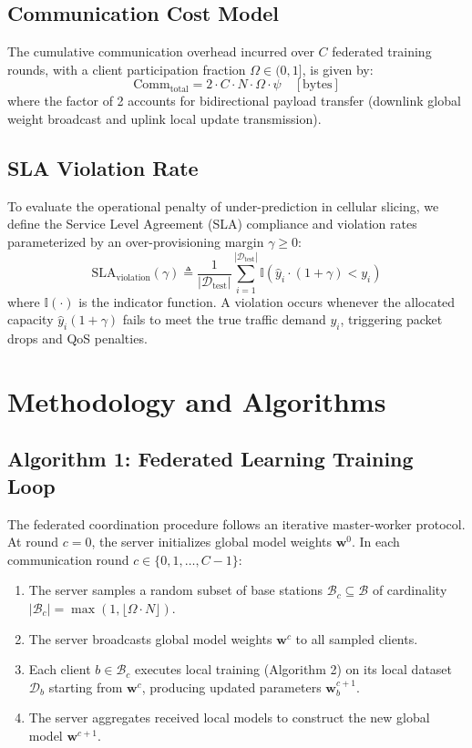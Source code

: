 \documentclass[10pt,journal,compsoc,twocolumn]{article}
\begin{document}
\subsection{Communication Cost Model}
The cumulative communication overhead incurred over $C$ federated training rounds, with a client participation fraction $\Omega \in (0, 1]$, is given by:
\begin{equation}
    \text{Comm}_{\text{total}} = 2 \cdot C \cdot N \cdot \Omega \cdot \psi \quad [\text{bytes}]
    \label{eq:comm_cost}
\end{equation}
where the factor of 2 accounts for bidirectional payload transfer (downlink global weight broadcast and uplink local update transmission).

\subsection{SLA Violation Rate}
To evaluate the operational penalty of under-prediction in cellular slicing, we define the Service Level Agreement (SLA) compliance and violation rates parameterized by an over-provisioning margin $\gamma \ge 0$:
\begin{equation}
    \text{SLA}_{\text{violation}}(\gamma) \triangleq \frac{1}{|\mathcal{D}_{\text{test}}|} \sum_{i=1}^{|\mathcal{D}_{\text{test}}|} \mathbb{I}\left( \hat{y}_i \cdot (1 + \gamma) < y_i \right)
    \label{eq:sla_violation}
\end{equation}
where $\mathbb{I}(\cdot)$ is the indicator function. A violation occurs whenever the allocated capacity $\hat{y}_i(1+\gamma)$ fails to meet the true traffic demand $y_i$, triggering packet drops and QoS penalties.

\section{Methodology and Algorithms}

\subsection{Algorithm 1: Federated Learning Training Loop}
The federated coordination procedure follows an iterative master-worker protocol. At round $c=0$, the server initializes global model weights $\mathbf{w}^0$. In each communication round $c \in \{0, 1, \dots, C-1\}$:
\begin{enumerate}
    \item The server samples a random subset of base stations $\mathcal{B}_c \subseteq \mathcal{B}$ of cardinality $|\mathcal{B}_c| = \max(1, \lfloor \Omega \cdot N \rfloor)$.
    \item The server broadcasts global model weights $\mathbf{w}^c$ to all sampled clients.
    \item Each client $b \in \mathcal{B}_c$ executes local training (Algorithm 2) on its local dataset $\mathcal{D}_b$ starting from $\mathbf{w}^c$, producing updated parameters $\mathbf{w}_b^{c+1}$.
    \item The server aggregates received local models to construct the new global model $\mathbf{w}^{c+1}$.
\end{enumerate}
\end{document}

